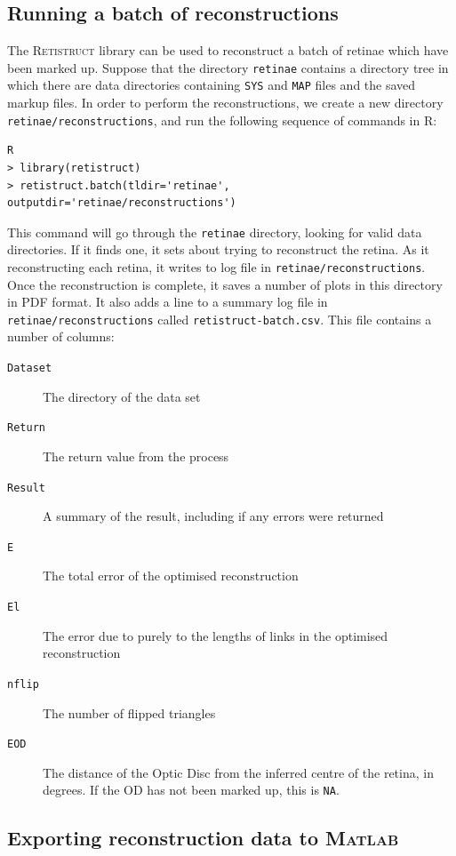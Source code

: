 \documentclass{article}
\begin{document}
\subsection{Running a batch of reconstructions}
\label{manual:sec:runn-batch-reconstr}

The \textsc{Retistruct} library can be used to reconstruct a batch of
retinae which have been marked up. Suppose that the directory
\texttt{retinae} contains a directory tree in which there are data
directories containing \texttt{SYS} and \texttt{MAP} files and the
saved markup files. In order to perform the reconstructions, we create
a new directory \texttt{retinae/reconstructions}, and run the
following sequence of commands in R:
\begin{verbatim}
R
> library(retistruct)
> retistruct.batch(tldir='retinae', outputdir='retinae/reconstructions')
\end{verbatim}
This command will go through the \texttt{retinae} directory, looking
for valid data directories. If it finds one, it sets about trying to
reconstruct the retina. As it reconstructing each retina, it writes to
log file in \texttt{retinae/reconstructions}. Once the reconstruction
is complete, it saves a number of plots in this directory in PDF
format. It also adds a line to a summary log file in
\texttt{retinae/reconstructions} called
\texttt{retistruct-batch.csv}. This file contains a number of columns:
\begin{description}
\item[\texttt{Dataset}] The directory of the data set
\item[\texttt{Return}] The return value from the process
\item[\texttt{Result}] A summary of the result, including if any
  errors were returned
\item[\texttt{E}] The total error  of the optimised reconstruction
\item[\texttt{El}] The error due to purely to the lengths of links in
  the optimised reconstruction
\item[\texttt{nflip}] The number of flipped triangles
\item[\texttt{EOD}] The distance of the Optic Disc from the inferred
  centre of the retina, in degrees. If the OD has not been marked up,
  this is \texttt{NA}.
\end{description}

\subsection{Exporting reconstruction data to \textsc{Matlab}}
\label{retistruct-manual:sec:export-reconstr-data}
\end{document}
